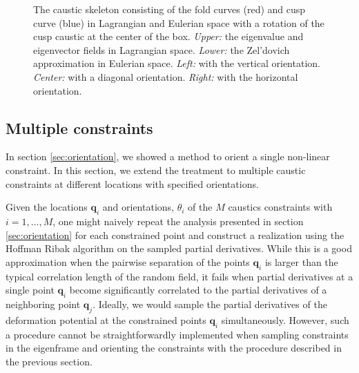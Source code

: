 \documentclass[a4paper, 11pt]{article}
\begin{document}
\begin{figure}
\begin{subfigure}[b]{0.4\textwidth}
\end{subfigure}
\caption{The caustic skeleton consisting of the fold curves (red) and cusp curve (blue) in Lagrangian and Eulerian space with a rotation of the cusp caustic at the center of the box. \textit{Upper:} the eigenvalue and eigenvector fields in Lagrangian space. \textit{Lower:} the Zel'dovich approximation in Eulerian space. \textit{Left:} with the vertical orientation. \textit{Center:} with a diagonal orientation. \textit{Right:} with the horizontal orientation.}\label{fig:rotation}
\end{figure}


\subsection{Multiple constraints}
In section \ref{sec:orientation}, we showed a method to orient a single non-linear constraint. In this section, we extend the treatment to multiple caustic constraints at different locations with specified orientations. 

Given the locations $\bm{q}_i$ and orientations, $\theta_i$ of the $M$ caustics constraints with $i=1,\dots,M$, one might naively repeat the analysis presented in section \ref{sec:orientation} for each constrained point and construct a realization using the Hoffman Ribak algorithm on the sampled partial derivatives. While this is a good approximation when the pairwise separation of the points $\bm{q}_i$ is larger than the typical correlation length of the random field, it fails when partial derivatives at a single point $\bm{q}_i$ become significantly correlated to the partial derivatives of a neighboring point $\bm{q}_j$. Ideally, we would sample the partial derivatives of the deformation potential at the constrained points $\bm{q}_i$ simultaneously. However, such a procedure cannot be straightforwardly implemented when sampling constraints in the eigenframe and orienting the constraints with the procedure described in the previous section.
\end{document}
